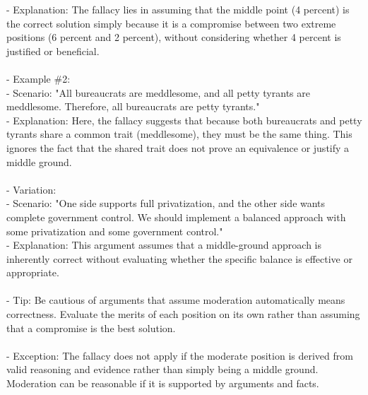 \documentclass[a4paper,12pt,single,pdftex]{scrartcl}
\begin{document}
    
        - Explanation: The fallacy lies in assuming that the middle point (4 percent) is the correct solution simply because it is a compromise between two extreme positions (6 percent and 2 percent), without considering whether 4 percent is justified or beneficial.
    \\

    
      
    \\

    
      - Example \#2:
    \\

    
        - Scenario: "All bureaucrats are meddlesome, and all petty tyrants are meddlesome. Therefore, all bureaucrats are petty tyrants."
    \\

    
        - Explanation: Here, the fallacy suggests that because both bureaucrats and petty tyrants share a common trait (meddlesome), they must be the same thing. This ignores the fact that the shared trait does not prove an equivalence or justify a middle ground.
    \\

    
      
    \\

    
      - Variation:
    \\

    
        - Scenario: "One side supports full privatization, and the other side wants complete government control. We should implement a balanced approach with some privatization and some government control."
    \\

    
        - Explanation: This argument assumes that a middle-ground approach is inherently correct without evaluating whether the specific balance is effective or appropriate.
    \\

    
      
    \\

    
      - Tip: Be cautious of arguments that assume moderation automatically means correctness. Evaluate the merits of each position on its own rather than assuming that a compromise is the best solution.
    \\

    
      
    \\

    
      - Exception: The fallacy does not apply if the moderate position is derived from valid reasoning and evidence rather than simply being a middle ground. Moderation can be reasonable if it is supported by arguments and facts.
    \\
\end{document}
